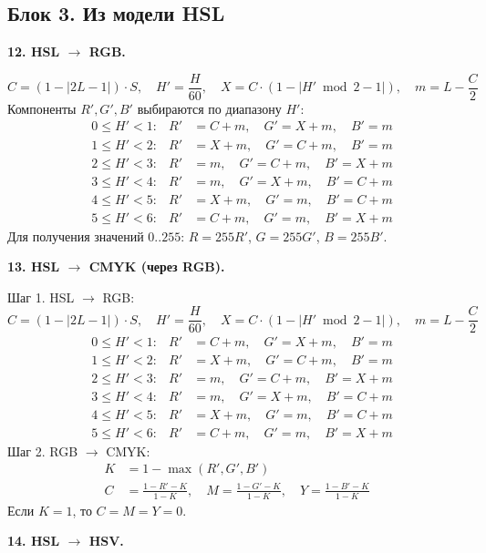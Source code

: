 \documentclass[12pt,a4paper]{article}
\begin{document}
\subsection{Блок 3. Из модели HSL}

\textbf{12. HSL \(\to\) RGB.}

\[
C = (1 - |2L - 1|) \cdot S,\quad H' = \frac{H}{60},\quad X = C \cdot (1 - |H' \bmod 2 - 1|),\quad m = L - \frac{C}{2}
\]
Компоненты \(R', G', B'\) выбираются по диапазону \(H'\):
\begin{align*}
&0 \le H' < 1: & R' &= C + m,\quad G' = X + m,\quad B' = m \\
&1 \le H' < 2: & R' &= X + m,\quad G' = C + m,\quad B' = m \\
&2 \le H' < 3: & R' &= m,\quad G' = C + m,\quad B' = X + m \\
&3 \le H' < 4: & R' &= m,\quad G' = X + m,\quad B' = C + m \\
&4 \le H' < 5: & R' &= X + m,\quad G' = m,\quad B' = C + m \\
&5 \le H' < 6: & R' &= C + m,\quad G' = m,\quad B' = X + m
\end{align*}
Для получения значений \(0..255\): \(R = 255 R'\), \(G = 255 G'\), \(B = 255 B'\).

\textbf{13. HSL \(\to\) CMYK (через RGB).}

Шаг 1. HSL \(\to\) RGB:
\[
C = (1 - |2L - 1|) \cdot S,\quad H' = \frac{H}{60},\quad X = C \cdot (1 - |H' \bmod 2 - 1|),\quad m = L - \frac{C}{2}
\]
\begin{align*}
&0 \le H' < 1: & R' &= C + m,\quad G' = X + m,\quad B' = m \\
&1 \le H' < 2: & R' &= X + m,\quad G' = C + m,\quad B' = m \\
&2 \le H' < 3: & R' &= m,\quad G' = C + m,\quad B' = X + m \\
&3 \le H' < 4: & R' &= m,\quad G' = X + m,\quad B' = C + m \\
&4 \le H' < 5: & R' &= X + m,\quad G' = m,\quad B' = C + m \\
&5 \le H' < 6: & R' &= C + m,\quad G' = m,\quad B' = X + m
\end{align*}
Шаг 2. RGB \(\to\) CMYK:
\begin{align*}
K &= 1 - \max(R', G', B') \\
C &= \frac{1 - R' - K}{1 - K},\quad M = \frac{1 - G' - K}{1 - K},\quad Y = \frac{1 - B' - K}{1 - K}
\end{align*}
Если \(K = 1\), то \(C = M = Y = 0\).

\textbf{14. HSL \(\to\) HSV.}
\end{document}
